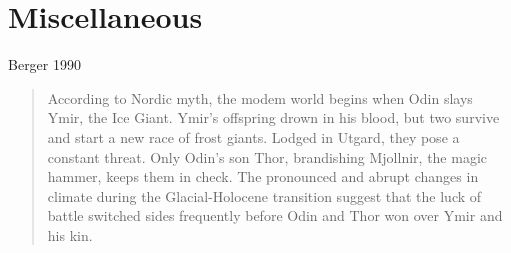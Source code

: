 \documentclass[11pt,letter]{article}
\begin{document}


\section{Miscellaneous}
Berger 1990
\begin{quote}
According to Nordic myth, the modem world begins when Odin slays Ymir, the Ice Giant. Ymir's offspring drown in his blood, but two survive and start a new race of frost giants. Lodged in Utgard, they pose a constant threat. Only Odin's son Thor, brandishing Mjollnir, the magic hammer, keeps them in check. The pronounced and abrupt changes in climate during the Glacial-Holocene transition suggest that the luck of battle switched sides frequently before Odin and Thor won over Ymir and his kin.
\end{quote}
\end{document}
